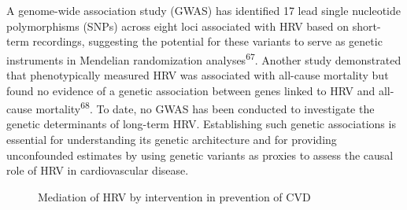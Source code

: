 \documentclass[
  a4paper,
  headsepline=true,
  open=any]{scrbook}
\begin{document}
A genome-wide association study (GWAS) has identified 17 lead single
nucleotide polymorphisms (SNPs) across eight loci associated with HRV
based on short-term recordings, suggesting the potential for these
variants to serve as genetic instruments in Mendelian randomization
analyses\textsuperscript{67}. Another study demonstrated that
phenotypically measured HRV was associated with all-cause mortality but
found no evidence of a genetic association between genes linked to HRV
and all-cause mortality\textsuperscript{68}. To date, no GWAS has been
conducted to investigate the genetic determinants of long-term HRV.
Establishing such genetic associations is essential for understanding
its genetic architecture and for providing unconfounded estimates by
using genetic variants as proxies to assess the causal role of HRV in
cardiovascular disease.

\begin{figure}

\begin{minipage}[t]{\linewidth}

{\centering 


\caption{Mediation of HRV by intervention in prevention of CVD}

}

\end{minipage}%

\end{figure}
\end{document}
